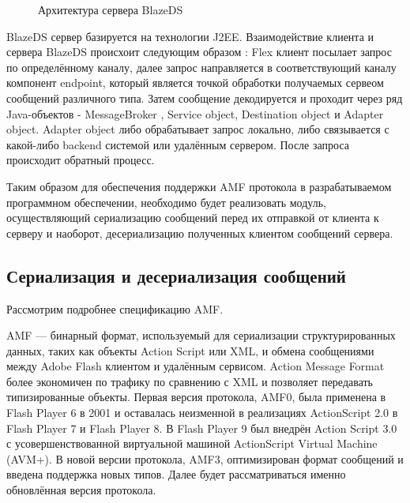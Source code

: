 \begin{figure}[ht]
\caption{Архитектура сервера BlazeDS}
\label{ris:blazeDSServer.png}
\end{figure}

BlazeDS сервер базируется на технологии J2EE. Взаимодействие клиента и сервера BlazeDS происхоит следующим 
образом : Flex клиент посылает запрос по определённому каналу, далее запрос направляется в соответствующий каналу 
компонент endpoint, который является точкой обработки получаемых сервеом сообщений различного типа. Затем сообщение 
декодируется и проходит через ряд Java-объектов - MessageBroker , Service object, Destination object и Adapter object.
Adapter object либо обрабатывает запрос локально, либо связывается с какой-либо backend системой или
удалённым сервером. После запроса происходит обратный процесс.
 
Таким образом для обеспечения поддержки AMF протокола в разрабатываемом программном 
обеспечении, необходимо будет реализовать модуль, осуществляющий сериализацию сообщений 
перед их отправкой от клиента к серверу и наоборот, десериализацию полученных клиентом сообщений 
сервера.

\subsection{Сериализация и десериализация сообщений}

Рассмотрим подробнее спецификацию AMF.

AMF --- бинарный формат, используемый для сериализации структурированных данных, таких как объекты Action Script или
XML, и обмена сообщениями между Adobe Flash клиентом и удалённым сервисом\cite{amf}. Action Message Format более экономичен
по трафику по сравнению с XML и позволяет передавать типизированные объекты. Первая версия протокола, AMF0, была 
применена в Flash Player 6 в 2001 и оставалась неизменной в реализациях ActionScript 2.0 в Flash Player 7 и Flash 
Player 8. В Flash Player 9 был внедрён Action Script 3.0 с усовершенствованной виртуальной машиной 
ActionScript Virtual Machine (AVM+). В новой версии протокола, AMF3, оптимизирован формат сообщений и введена 
поддержка новых типов. Далее будет рассматриваться именно обновлённая версия протокола.

